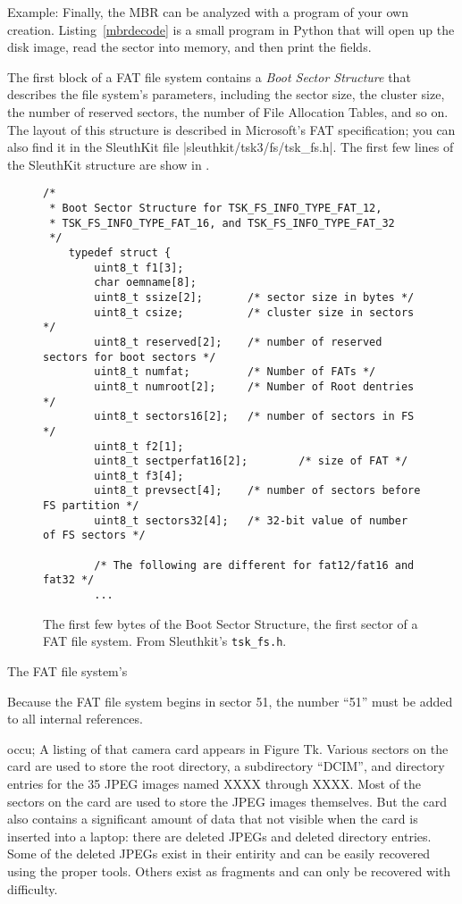 Example: Finally, the MBR can be analyzed with a program of your own
creation. Listing~\ref{mbrdecode} is a small program in Python that will open
up the disk image, read the sector into memory, and then print the
fields. 

\label{mbrdecode}


The first block of a FAT file system contains a \emph{Boot Sector
  Structure} that describes the file system's parameters, including
the sector size, the cluster size, the number of reserved sectors, the
number of File Allocation Tables, and so on. The layout of this
structure is described in Microsoft's FAT specification; you can also
find it in the SleuthKit file |sleuthkit/tsk3/fs/tsk_fs.h|. The first
few lines of the SleuthKit structure are show in .

\begin{figure}
\begin{lstlisting}
/*
 * Boot Sector Structure for TSK_FS_INFO_TYPE_FAT_12,
 * TSK_FS_INFO_TYPE_FAT_16, and TSK_FS_INFO_TYPE_FAT_32
 */
    typedef struct {
        uint8_t f1[3];
        char oemname[8];
        uint8_t ssize[2];       /* sector size in bytes */
        uint8_t csize;          /* cluster size in sectors */
        uint8_t reserved[2];    /* number of reserved sectors for boot sectors */
        uint8_t numfat;         /* Number of FATs */
        uint8_t numroot[2];     /* Number of Root dentries */
        uint8_t sectors16[2];   /* number of sectors in FS */
        uint8_t f2[1];
        uint8_t sectperfat16[2];        /* size of FAT */
        uint8_t f3[4];
        uint8_t prevsect[4];    /* number of sectors before FS partition */
        uint8_t sectors32[4];   /* 32-bit value of number of FS sectors */

        /* The following are different for fat12/fat16 and fat32 */
        ...
\end{lstlisting}
\caption{The first few bytes of the Boot Sector Structure, the first
  sector of a FAT file system. From Sleuthkit's \texttt{tsk\_fs.h}.\label{BSS}}
\end{figure}

The FAT file system's 

Because the FAT file system begins in sector 51, the number ``51''
must be added to all internal references.

occu; A listing of
that camera card appears in Figure Tk. Various sectors on the card are
used to store the root directory, a subdirectory ``DCIM'', and
directory entries for the 35 JPEG
images named XXXX through XXXX. Most of the sectors on the card are
used to store the JPEG images themselves. But the card also contains a
significant amount of data that not visible when the card is
inserted into a laptop: there are deleted JPEGs and deleted directory
entries. Some of the deleted JPEGs exist in their entirity and can be
easily recovered using the proper tools. Others exist as fragments and
can only be recovered with difficulty. 

